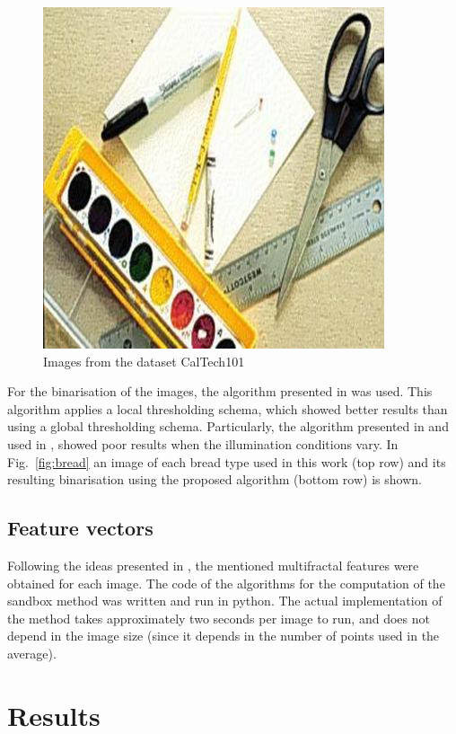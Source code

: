 \documentclass[oneside,a4paper,english,links]{article}
\begin{document}
\begin{figure}[htb]
\includegraphics[scale=0.20]{imagenes/image_0048}
\caption{Images from the dataset CalTech101}
\label{fig:nonbread}
\end{figure}

For the binarisation of the images, the algorithm presented in \cite{White83} was used. This algorithm applies a local thresholding schema, which showed better results than using a global thresholding schema. Particularly, the algorithm presented in \cite{Huang95} and used in \cite{Gonzales2008}, showed poor results when the illumination conditions vary. In Fig.~\ref{fig:bread} an image of each bread type used in this work (top row) and its resulting binarisation using the proposed algorithm (bottom row) is shown.  

\subsection{Feature vectors}

Following the ideas presented in \cite{Gonzales2008}, the mentioned multifractal features were obtained for each image. The code of the algorithms for the computation of the sandbox method was written and run in python. The actual implementation of the method takes approximately two seconds per image to run, and does not depend in the image size (since it depends in the number of points used in the average).

\section{Results}
\end{document}

